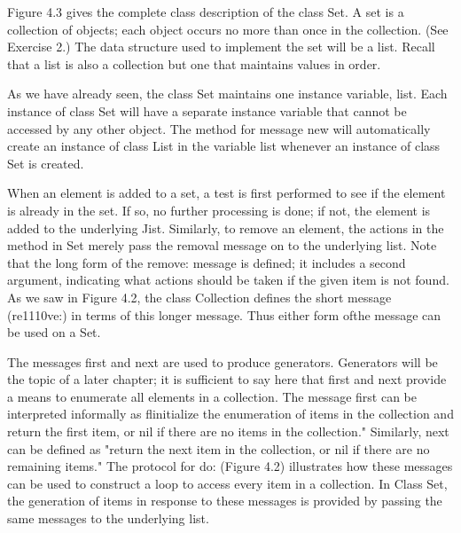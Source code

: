 
Figure 4.3 gives the complete class description of the class Set. A set is a
collection of objects; each object occurs no more than once in the collection. (See Exercise 2.) The data structure used to implement the set will
be a list. Recall that a list is also a collection but one that maintains values
in order.



As we have already seen, the class Set maintains one instance variable,
list. Each instance of class Set will have a separate instance variable that
cannot be accessed by any other object. The method for message new will
automatically create an instance of class List in the variable list whenever
an instance of class Set is created.

When an element is added to a set, a test is first performed to see if
the element is already in the set. If so, no further processing is done; if
not, the element is added to the underlying Jist. Similarly, to remove an
element, the actions in the method in Set merely pass the removal message
on to the underlying list. Note that the long form of the remove: message
is defined; it includes a second argument, indicating what actions should
be taken if the given item is not found. As we saw in Figure 4.2, the class
Collection defines the short message (re1110ve:) in terms of this longer
message. Thus either form ofthe message can be used on a Set.

The messages first and next are used to produce generators. Generators
will be the topic of a later chapter; it is sufficient to say here that first and
next provide a means to enumerate all elements in a collection. The message first can be interpreted informally as flinitialize the enumeration of
items in the collection and return the first item, or nil if there are no items
in the collection." Similarly, next can be defined as "return the next item
in the collection, or nil if there are no remaining items." The protocol for
do: (Figure 4.2) illustrates how these messages can be used to construct a
loop to access every item in a collection. In Class Set, the generation of
items in response to these messages is provided by passing the same messages to the underlying list.

